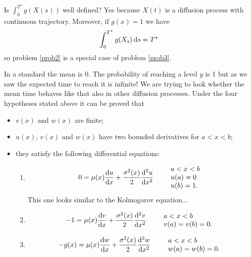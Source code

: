 \documentclass[12pt]{report}
\begin{document}
\begin{remark}
	Is $\int_{0}^{T^\star}g(X(s))$ well defined? Yes because $X(t)$ is a diffusion process with continuous trajectory. Moreover, if $g(x)=1$ we have
	\begin{equation*}
		\int_{0}^{T^{\star}}g(X_{s})\mathop{}\!\mathrm{d} s=T^{\star}
	\end{equation*}
	so problem \ref{prob2} is a special case of problem \ref{prob3}.
\end{remark}
In a standard \bwm{} the mean is 0. The probability of reaching a level $y$ is 1 but as we saw the expected time to reach it is infinite! We are trying to look whether the mean time behaves like that also in other diffusion processes. Under the four hypotheses stated above it can be proved that
\begin{itemize}
	\item $v(x)$ and $w(x)$ are finite;
	\item $u(x)$, $v(x)$ and $w(x)$ have two bounded derivatives for $a<x<b$;
	\item they satisfy the following differential equations:
	\begin{enumerate}[\bfseries A:]
		\item \begin{equation*}
			0=\mu(x)\frac{\mathop{}\!\mathrm{d} u}{\mathop{}\!\mathrm{d} x}+\frac{\sigma^{2}(x)}{2}\frac{\mathop{}\!\mathrm{d}^{2}u}{\mathop{}\!\mathrm{d} x^{2}}\qquad\begin{array}{l}
				a<x<b\\
				u(a)=0\\
				u(b)=1.
			\end{array}
		\end{equation*}
		This one looks similar to the Kolmogorov equation...
		\item \begin{equation*}
			-1=\mu(x)\frac{\mathop{}\!\mathrm{d} v}{\mathop{}\!\mathrm{d} x}+\frac{\sigma^{2}(x)}{2}\frac{\mathop{}\!\mathrm{d}^{2}v}{\mathop{}\!\mathrm{d} x^{2}}\qquad\begin{array}{l}
				a<x<b\\
				v(a)=v(b)=0.
			\end{array}
		\end{equation*}
		\item \begin{equation*}
			-g(x)=\mu(x)\frac{\mathop{}\!\mathrm{d} w}{\mathop{}\!\mathrm{d} x}+\frac{\sigma^{2}(x)}{2}\frac{\mathop{}\!\mathrm{d}^{2}w}{\mathop{}\!\mathrm{d} x^{2}}\qquad\begin{array}{l}
				a<x<b\\
				w(a)=w(b)=0.
			\end{array}
		\end{equation*}
	\end{enumerate}
\end{itemize}
\end{document}
